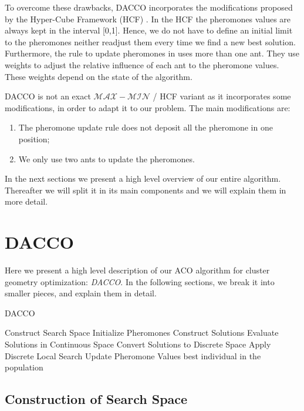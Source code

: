 To overcome these drawbacks, DACCO incorporates the modifications proposed by the Hyper-Cube Framework (HCF) \cite{blum04}. In the HCF the pheromones values are always kept in the interval [0,1]. Hence, we do not have to define an initial limit to the pheromones neither readjust them every time we find a new best solution. Furthermore, the rule to update pheromones in \cite{blum04} uses more than one ant. They use weights to adjust the relative influence of each ant to the pheromone values. These weights depend on the state of the algorithm.

DACCO is not an exact $\mathcal{MAX}-\mathcal{MIN}$ / HCF variant as it incorporates some modifications, in order to adapt it to our problem. The main modifications are:
\begin{enumerate}
	\item The pheromone update rule does not deposit all the pheromone in one position;
	\item We only use two ants to update the pheromones.
\end{enumerate}

In the next sections we present a high level overview of our entire algorithm. Thereafter we will split it in its main components and we will explain them in more detail.
	\section{DACCO}
	Here we present a high level description of our ACO algorithm for cluster geometry optimization: \emph{DACCO}. In the following sections, we break it into smaller pieces, and explain them in detail.

	\begin{algorithm}
		\caption{DACCO}
		\label{alg:dacco}
		\begin{algorithmic}
		\STATE Construct Search Space
		\STATE Initialize Pheromones
			\STATE Construct Solutions
			\STATE Evaluate Solutions in Continuous Space
			\STATE Convert Solutions to Discrete Space
			\STATE Apply Discrete Local Search
			\STATE Update Pheromone Values
		\ENDWHILE
		\RETURN best individual in the population
		\end{algorithmic}
	\end{algorithm}
	
	\subsection{Construction of Search Space}
	
